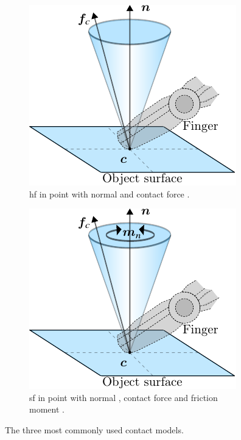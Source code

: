 \begin{figure}[h]
\begin{subfigure}[b]{0.3\textwidth}
		\includegraphics[width=\textwidth]{chapters/modeling/fig/hf.pdf}
		\caption{\gls{hf} in point  with normal  and contact force .}
		\label{fig:hf}
	\end{subfigure}
	\hfill
	\begin{subfigure}[b]{0.3\textwidth}
		\centering
		\includegraphics[width=\textwidth]{chapters/modeling/fig/sf.pdf}
		\caption{\gls{sf} in point  with normal , contact force  and friction moment .}
		\label{fig:sf}
	\end{subfigure}
	   \caption{The three most commonly used contact models.}
	   \label{fig:contact-models}
\end{figure}


